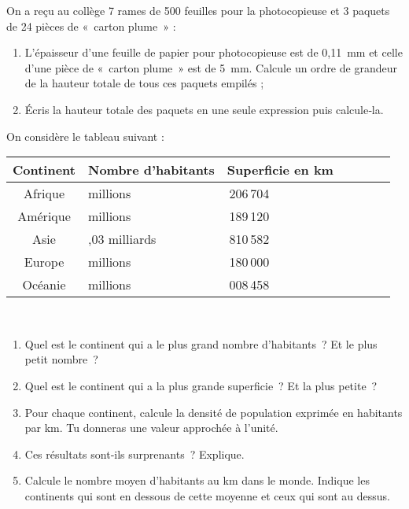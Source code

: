 \newpage          %



\begin{exercice}
On a reçu au collège 7 rames de 500 feuilles pour la photocopieuse et 3 paquets de 24 pièces de « carton plume » :
\begin{enumerate}
 \item L'épaisseur d'une feuille de papier pour photocopieuse est de 0,11 mm et celle d'une pièce de « carton plume » est de 5 mm. Calcule un ordre de grandeur de la hauteur totale de tous ces paquets empilés ;
 \item Écris la hauteur totale des paquets en une seule expression puis calcule‑la.
 \end{enumerate}
\end{exercice}


\begin{exercice}
On considère le tableau suivant :

\begin{center}
\begin{tabularx}{\linewidth}{|c|*{6}{>{\centering \arraybackslash}X|}}
\hline \rowcolor{U1} Continent & Nombre d'habitants & Superficie en km\up{2} \\
\hline \rowcolor{A3} Afrique & 965 millions & 30\,206\,704 \\
\hline \rowcolor{A3} Amérique & 911 millions & 42\,189\,120 \\
\hline \rowcolor{A3} Asie & 4,03 milliards & 43\,810\,582 \\
\hline \rowcolor{A3} Europe & 731 millions & 10\,180\,000 \\
\hline \rowcolor{A3} Océanie & 34 millions & 9\,008\,458 \\
\hline
\end{tabularx} \\
\end{center}

\begin{enumerate}
 \item Quel est le continent qui a le plus grand nombre d'habitants ? Et le plus petit nombre ?
 \item Quel est le continent qui a la plus grande superficie ? Et la plus petite ?
 \item Pour chaque continent, calcule la densité de population exprimée en habitants par km. Tu donneras une valeur approchée à l'unité. 
 \item Ces résultats sont‑ils surprenants ? Explique.
 \item Calcule le nombre moyen d'habitants au km dans le monde. Indique les continents qui sont en dessous de cette moyenne et ceux qui sont au dessus. 
 \end{enumerate}
\end{exercice}


